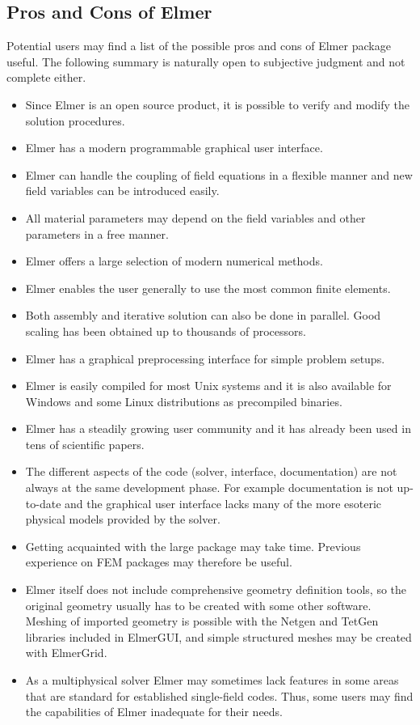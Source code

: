 \subsection*{Pros and Cons of Elmer}
Potential users may find a list of the possible pros and cons of Elmer package useful.
The following summary is naturally open to subjective judgment and not complete either.
\begin{itemize}
\item[+] Since Elmer is an open source product, it is possible to verify and modify the solution procedures.
\item[+] Elmer has a modern programmable graphical user interface.
\item[+] Elmer can handle the coupling of field equations in a flexible manner and new field variables can be 
  introduced easily.
\item[+] All material parameters may depend on the field variables and other parameters in a free manner.
\item[+] Elmer offers a large selection of modern numerical methods.
\item[+] Elmer enables the user generally to use the most common finite elements.
\item[+] Both assembly and iterative solution can also be done in parallel. Good scaling has been obtained up to thousands of processors. 
\item[+] Elmer has a graphical preprocessing interface for simple problem setups.
\item[+] Elmer is easily compiled for most Unix systems and it is also available
  for Windows and some Linux distributions as precompiled binaries.
\item[+] Elmer has a steadily growing user community and it has already been used in tens of 
   scientific papers. 
\item[-] The different aspects of the code (solver, interface, documentation) are not always at the same
development phase. For example documentation is not up-to-date and the graphical user interface lacks many of the more esoteric
physical models provided by the solver. 
\item[-] Getting acquainted with the large package may take time. Previous experience on FEM packages 
  may therefore be useful.
\item[-] Elmer itself does not include comprehensive geometry definition tools, so the 
  original geometry usually has to be created with some other software. Meshing of imported 
  geometry is possible with the Netgen and TetGen libraries included in ElmerGUI, and simple 
  structured meshes may be created with ElmerGrid.
\item[-] As a multiphysical solver Elmer may sometimes lack features in some areas that are standard for
	established single-field codes. 
         Thus, some users may find the capabilities of Elmer inadequate for their needs. 
\end{itemize}





